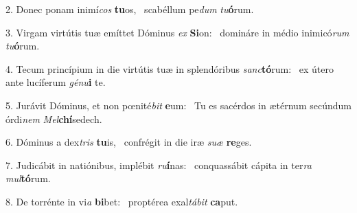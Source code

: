 2. Donec ponam inimí\textit{cos} \textbf{tu}os, \ast\  scabéllum pe\textit{dum} \textit{tu}\textbf{ó}rum.\

3. Virgam virtútis tuæ emíttet Dóminus \textit{ex} \textbf{Si}on: \ast\  domináre in médio inimicó\textit{rum} \textit{tu}\textbf{ó}rum.\

4. Tecum princípium in die virtútis tuæ in splendóribus \textit{sanc}\textbf{tó}rum: \ast\  ex útero ante lucíferum \textit{gé}\textit{nu}\textbf{i} te.\

5. Jurávit Dóminus, et non pœnité\textit{bit} \textbf{e}um: \ast\  Tu es sacérdos in ætérnum secúndum órdi\textit{nem} \textit{Mel}\textbf{chí}sedech.\

6. Dóminus a dex\textit{tris} \textbf{tu}is, \ast\  confrégit in die iræ \textit{su}\textit{æ} \textbf{re}ges.\

7. Judicábit in natiónibus, implébit \textit{ru}\textbf{í}nas: \ast\  conquassábit cápita in ter\textit{ra} \textit{mul}\textbf{tó}rum.\

8. De torrénte in vi\textit{a} \textbf{bi}bet: \ast\  proptérea exal\textit{tá}\textit{bit} \textbf{ca}put.\

